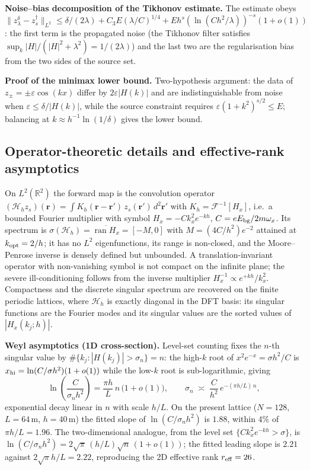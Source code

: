 \documentclass[12pt,a4paper]{article}
\begin{document}
\textbf{Noise--bias decomposition of the Tikhonov estimate.}
The estimate obeys
$\|z_\lambda^\delta-z_s^\dagger\|_{L^2}\le\delta/(2\lambda)+
C_3E(\lambda/C)^{1/4}+Eh^s(\ln(Ch^2/\lambda))^{-s}(1+o(1))$: the first
term is the propagated noise (the Tikhonov filter satisfies
$\sup_k|H|/(|H|^2+\lambda^2)=1/(2\lambda)$) and the last two are the
regularisation bias from the two sides of the source set.

\textbf{Proof of the minimax lower bound.}
Two-hypothesis argument: the data of $z_\pm=\pm\varepsilon\cos(kx)$ differ
by $2\varepsilon|H(k)|$ and are indistinguishable from noise when
$\varepsilon\le\delta/|H(k)|$, while the source constraint requires
$\varepsilon(1+k^2)^{s/2}\le E$; balancing at
$k\approx h^{-1}\ln(1/\delta)$ gives the lower bound.

\subsection{Operator-theoretic details and effective-rank asymptotics}

On $L^2(\mathbb{R}^2)$ the forward map is the convolution operator
$(\mathcal{H}_h z_s)(\mathbf{r})=\int K_h(\mathbf{r}-\mathbf{r}')\,z_s(\mathbf{r}')\,d^2\mathbf{r}'$
with $K_h=\mathcal{F}^{-1}[H_x]$, i.e.~a bounded Fourier multiplier with
symbol $H_x=-C k_x^2 e^{-kh}$, $C=eE_{\rm bg}/2m\omega_x$.  Its spectrum
is $\sigma(\mathcal{H}_h)=\overline{\operatorname{ran}H_x}=[-M,0]$ with
$M=(4C/h^2)e^{-2}$ attained at $k_{\rm opt}=2/h$; it has no $L^2$
eigenfunctions, its range is non-closed, and the Moore--Penrose inverse
is densely defined but unbounded.  A translation-invariant operator with
non-vanishing symbol is not compact on the infinite plane; the severe
ill-conditioning follows from the inverse multiplier
$H_x^{-1}\propto e^{+kh}/k_x^2$.  Compactness and the discrete singular
spectrum are recovered on the finite periodic lattices, where
$\mathcal{H}_h$ is exactly diagonal in the DFT basis: its singular
functions are the Fourier modes and its singular values are the sorted
values of $|H_x(k_j;h)|$.

\textbf{Weyl asymptotics (1D cross-section).}  Level-set counting fixes
the $n$-th singular value by $\#\{k_j:|H(k_j)|>\sigma_n\}=n$: the
high-$k$ root of $x^2e^{-x}=\sigma h^2/C$ is
$x_{\rm hi}=\ln(C/\sigma h^2)(1+o(1))$ while the low-$k$ root is
sub-logarithmic, giving
\begin{equation}
\ln\!\left(\frac{C}{\sigma_n h^2}\right)
 = \frac{\pi h}{L}\,n\,\bigl(1+o(1)\bigr),
\qquad
\sigma_n \;\asymp\; \frac{C}{h^2}\,e^{-(\pi h/L)\,n},
\end{equation}
exponential decay linear in $n$ with scale $h/L$.  On the present lattice
($N=128$, $L=64$\,\textmu m, $h=40$\,\textmu m) the fitted slope of
$\ln(C/\sigma_n h^2)$ is $1.88$, within $4\%$ of $\pi h/L=1.96$.  The
two-dimensional analogue, from the level set
$\{Ck_x^2e^{-kh}>\sigma\}$, is
$\ln(C/\sigma_n h^2)=2\sqrt{\pi}\,(h/L)\sqrt n\,(1+o(1))$; the fitted
leading slope is $2.21$ against $2\sqrt\pi h/L=2.22$, reproducing the 2D
effective rank $r_{\rm eff}=26$.
\end{document}
